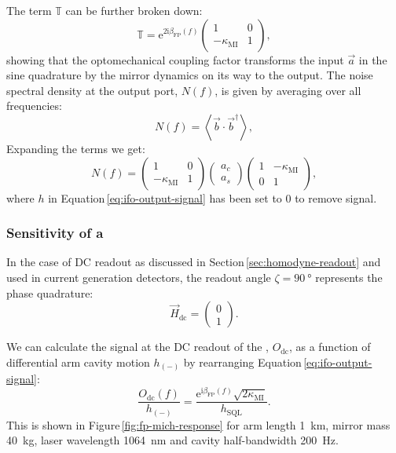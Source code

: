 The term $\mathbb{T}$ can be further broken down:
\begin{equation}
  \mathbb{T} = \text{e}^{2 \text{i} \beta_{\text{FP}} \left( f \right)}
  \begin{pmatrix}
    1 & 0 \\
    -\kappa_{\text{MI}} & 1
  \end{pmatrix},
\end{equation}
showing that the optomechanical coupling factor transforms the input $\vec{a}$ in the sine quadrature by the mirror dynamics on its way to the output. The noise spectral density at the output port, $N \left( f \right)$, is given by averaging over all frequencies:
\begin{equation}
  N \left( f \right) = \left< \vec{b} \cdot \vec{b}^{\dag} \right>,
\end{equation}
Expanding the terms we get:
\begin{equation}
  N \left( f \right) =
  \begin{pmatrix}
    1 & 0 \\
    -\kappa_{\text{MI}} & 1
  \end{pmatrix}
  \begin{pmatrix}
    a_c \\
    a_s
  \end{pmatrix}
  \begin{pmatrix}
    1 & -\kappa_{\text{MI}} \\
    0 & 1
  \end{pmatrix},
\end{equation}
where $h$ in Equation\,\ref{eq:ifo-output-signal} has been set to \num{0} to remove signal.

\subsubsection{Sensitivity of a \FPMI{}}
In the case of \gls{DC} readout as discussed in Section\,\ref{sec:homodyne-readout} and used in current generation detectors, the readout angle $\zeta = \SI{90}{\degree}$ represents the phase quadrature:
\begin{equation}
  \vec{H}_{\text{dc}} =
  \begin{pmatrix}
    0 \\
    1
  \end{pmatrix}.
\end{equation}

We can calculate the signal at the \gls{DC} readout of the \FPMI{}, $O_{\text{dc}}$, as a function of differential arm cavity motion $h_{\left( - \right)}$ by rearranging Equation\,\ref{eq:ifo-output-signal}:
\begin{equation}
  \frac{O_{\text{dc}} \left( f \right)}{h_{\left( - \right)}} = \frac{\text{e}^{\text{i} \beta_{\text{FP}} \left( f \right)} \sqrt{2 \kappa_{\text{MI}}}}{h_{\text{SQL}}}.
\end{equation}
This is shown in Figure\,\ref{fig:fp-mich-response} for arm length \SI{1}{\kilo\meter}, mirror mass \SI{40}{\kilo\gram}, laser wavelength \SI{1064}{\nano\meter} and cavity half-bandwidth \SI{200}{\hertz}. 

